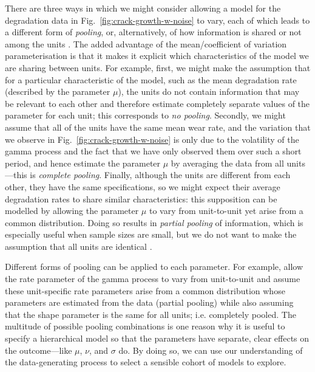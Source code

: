 There are three ways in which we might consider allowing a model for the degradation data in Fig.~\ref{fig:crack-growth-w-noise} to vary, each of which leads to a different form of \emph{pooling}, or, alternatively, of how information is shared or not among the units \citep{Johnson_2022}. The added advantage of the mean/coefficient of variation parameterisation is that it makes it explicit which characteristics of the model we are sharing between units. For example, first, we might make the assumption that for a particular characteristic of the model, such as the mean degradation rate (described by the parameter $\mu$), the units do not contain information that may be relevant to each other and therefore estimate completely separate values of the parameter for each unit; this corresponds to \emph{no pooling}. Secondly, we might assume that all of the units have the same mean wear rate, and the variation that we observe in Fig.~\ref{fig:crack-growth-w-noise} is only due to the volatility of the gamma process and the fact that we have only observed them over such a short period, and hence estimate the parameter $\mu$ by averaging the data from all units---this is \emph{complete pooling}. Finally, although the units are different from each other, they have the same specifications, so we might expect their average degradation rates to share similar characteristics: this supposition can be modelled by allowing the parameter $\mu$ to vary from unit-to-unit yet arise from a common distribution. Doing so results in \emph{partial pooling} of information, which is especially useful when sample sizes are small, but we do not want to make the assumption that all units are identical \cite[Section~13.1]{McElreath_2020}.

Different forms of pooling can be applied to each parameter. For example, \citet{lawless2004} allow the rate parameter of the gamma process to vary from unit-to-unit and assume these unit-specific rate parameters arise from a common distribution whose parameters are estimated from the data (partial pooling) while also assuming that the shape parameter is the same for all units; i.e. completely pooled. The multitude of possible pooling combinations is one reason why it is useful to specify a hierarchical model so that the parameters have separate, clear effects on the outcome---like $\mu$, $\nu$, and $\sigma$ do. By doing so, we can use our understanding of the data-generating process to select a sensible cohort of models to explore.


